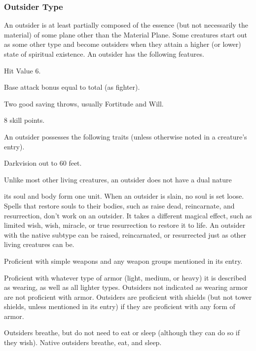 \subsubsection{Outsider Type} An outsider is at least partially composed of the essence (but not necessarily the material) of some plane other than the Material Plane. Some creatures start out as some other type and become outsiders when they attain a higher (or lower) state of spiritual existence.
 An outsider has the following features.
\begin{itemize*}
\item Hit Value 6.
\item Base attack bonus equal to total  (as fighter).
\item Two good saving throws, usually Fortitude and Will.
\item 8 skill points.
\end{itemize*}
 An outsider possesses the following traits (unless otherwise noted in a creature's entry).
\begin{itemize*}
\item Darkvision out to 60 feet.
\item Unlike most other living creatures, an outsider does not have a dual nature\item its soul and body form one unit. When an outsider is slain, no soul is set loose. Spells that restore souls to their bodies, such as raise dead, reincarnate, and resurrection, don't work on an outsider. It takes a different magical effect, such as limited wish, wish, miracle, or true resurrection to restore it to life. An outsider with the native subtype can be raised, reincarnated, or resurrected just as other living creatures can be.
\item Proficient with simple weapons and any weapon groups mentioned in its entry.
\item Proficient with whatever type of armor (light, medium, or heavy) it is described as wearing, as well as all lighter types. Outsiders not indicated as wearing armor are not proficient with armor. Outsiders are proficient with shields (but not tower shields, unless mentioned in its entry) if they are proficient with any form of armor.
\item Outsiders breathe, but do not need to eat or sleep (although they can do so if they wish). Native outsiders breathe, eat, and sleep.
\end{itemize*}

